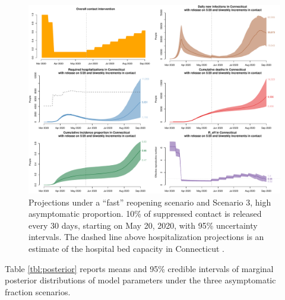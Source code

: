 \documentclass[11pt]{article}
\begin{document}
\begin{figure}[htb]
	\centering
	\includegraphics[width=.9\textwidth]{figures/fast_high_full.pdf}
	\caption{Projections under a ``fast'' reopening scenario and Scenario 3, high asymptomatic proportion. 10\% of suppressed contact is released every 30 days, starting on May 20, 2020, with 95\% uncertainty intervals. The dashed line above hospitalization projections is an estimate of the hospital bed capacity in Connecticut \citep{CHAwebsite}. }
	\label{fig:fast_high}
\end{figure}




Table \ref{tbl:posterior} reports means and 95\% credible intervals of marginal posterior distributions of model parameters under the three asymptomatic fraction scenarios.
\end{document}
